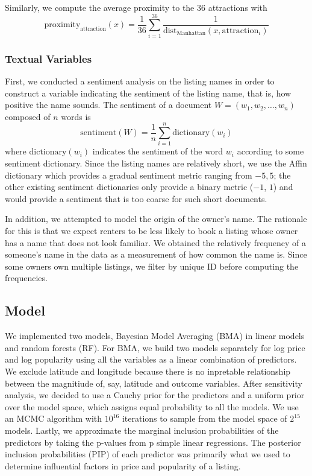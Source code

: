 \documentclass[10pt]{jmlr}%
\begin{document}
Similarly, we compute the average proximity to the $36$ attractions with
$$\text{proximity}_\text{attraction}(x) = \dfrac{1}{36} \sum_{i=1}^{36} \dfrac{1}{\text{dist}_{\text{Manhattan}}(x,\text{attraction}_i)}$$

\subsubsection{Textual Variables}
First, we conducted a sentiment analysis on the listing names in order to construct a variable indicating the sentiment of the listing name, that is, how positive the name sounds. The sentiment of a document $W = (w_1, w_2, \dots, w_n)$ composed of $n$ words is
$$\text{sentiment}(W) = \dfrac{1}{n} \sum_{i=1}^{n} \text{dictionary}(w_i)$$
where $\text{dictionary}(w_i)$ indicates the sentiment of the word $w_i$ according to some sentiment dictionary. Since the listing names are relatively short, we use the Affin dictionary which provides a gradual sentiment metric ranging from $-5, 5$; the other existing sentiment dictionaries only provide a binary metric ($-1$, $1$) and would provide a sentiment that is too coarse for such short documents.

In addition, we attempted to model the origin of the owner's name. The rationale for this is that we expect renters to be less likely to book a listing whose owner has a name that does not look familiar. We obtained the relatively frequency of a someone's name in the data as a measurement of how common the name is. Since some owners own multiple listings, we filter by unique ID before computing the frequencies.



\subsection{Model}
We implemented two models, Bayesian Model Averaging (BMA) in linear models and random forests (RF). For BMA, we build two models separately for log price and log popularity using all the variables as a linear combination of predictors. We exclude latitude and longitude because there is no inpretable relationship between the magnitiude of, say, latitude and outcome variables. After sensitivity analysis, we decided to use a Cauchy prior for the predictors and a uniform prior over the model space, which assigns equal probability to all the models. We use an MCMC algorithm with $10^{16}$ iterations to sample from the model space of $2^{15}$ models. Lastly, we approximate the marginal inclusion probabilities of the predictors by taking the p-values from p simple linear regressions. The posterior inclusion probabilities (PIP) of each predictor was primarily what we used to determine influential factors in price and popularity of a listing. 
\end{document}

